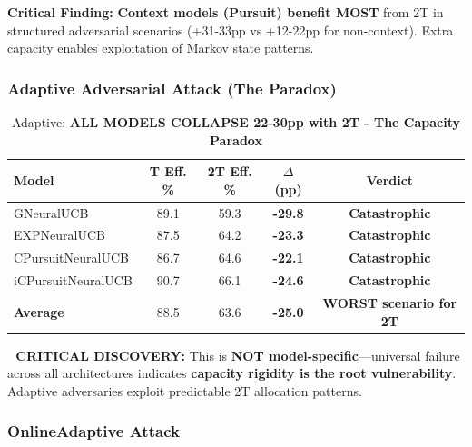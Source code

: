 \documentclass[11pt,a4paper]{article}
\newcommand{\critical}[1]{\textcolor{criticalcolor}{\textbf{#1}}}
\newcommand{\success}[1]{\textcolor{successcolor}{\textbf{#1}}}
\begin{document}
\vspace{-0.2cm}

\textbf{Critical Finding:} \success{Context models (Pursuit) benefit MOST} from 2T in structured adversarial scenarios (+31-33pp vs +12-22pp for non-context). Extra capacity enables exploitation of Markov state patterns.

\subsubsection{Adaptive Adversarial Attack (The Paradox)}

\vspace{-0.4cm}

\begin{table}[H]
\scriptsize
\centering
\begin{tabular}{lcccc}
\toprule
\textbf{Model} & \textbf{T Eff. \%} & \textbf{2T Eff. \%} & \textbf{$\Delta$ (pp)} & \textbf{Verdict} \\
\midrule
GNeuralUCB & 89.1 & 59.3 & \critical{-29.8} & \critical{Catastrophic} \\
EXPNeuralUCB & 87.5 & 64.2 & \critical{-23.3} & \critical{Catastrophic} \\
CPursuitNeuralUCB & 86.7 & 64.6 & \critical{-22.1} & \critical{Catastrophic} \\
iCPursuitNeuralUCB & 90.7 & 66.1 & \critical{-24.6} & \critical{Catastrophic} \\
\midrule
\textbf{Average} & 88.5 & 63.6 & \critical{-25.0} & \critical{WORST scenario for 2T} \\
\bottomrule
\end{tabular}
\vspace{-0.2cm}
\caption{Adaptive: \critical{ALL MODELS COLLAPSE 22-30pp with 2T - The Capacity Paradox}}
\end{table}

\vspace{-0.2cm}

\textbf{🚨 CRITICAL DISCOVERY:} This is \critical{NOT model-specific}—universal failure across all architectures indicates \textbf{capacity rigidity is the root vulnerability}. Adaptive adversaries exploit predictable 2T allocation patterns.

\subsubsection{OnlineAdaptive Attack}

\vspace{-0.4cm}
\end{document}
